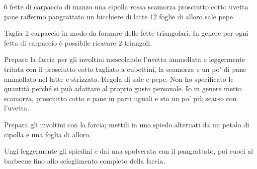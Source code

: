 \begin{ingreds}
	6 fette di carpaccio di manzo
	una cipolla rossa
	scamorza
	prosciutto cotto 
	uvetta
	pane raffermo
	pangrattato
	un bicchiere di latte
	12 foglie di alloro
	sale
	pepe
\end{ingreds}

\begin{method}
Taglia il carpaccio in modo da formare delle fette triangolari. In genere per ogni fetta di carpaccio è possibile ricavare 2 triangoli.

Prepara la farcia per gli involtini mescolando l'uvetta ammollata e leggermente tritata con il prosciutto cotto tagliato a cubettini, la scamorza e un po' di pane ammollato nel latte e strizzato. Regola di sale e pepe. Non ho specificato le quantità perché si può adattare al proprio gusto personale. Io in genere metto scamorza, prosciutto cotto e pane in parti uguali e sto un po' più scarso con l'uvetta.

Prepara gli involtini con la farcia; mettili in uno spiedo alternati da un petalo di cipolla e una foglia di alloro.

Ungi leggermente gli  spiedini e dai una spolverata con il pangrattato, poi cuoci al barbecue fino allo scioglimento completo della farcia.

\end {method}


